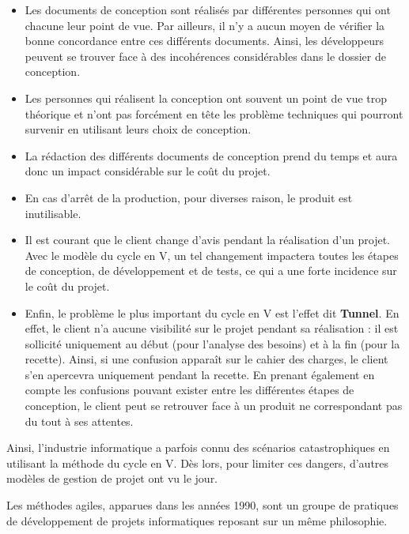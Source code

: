 \begin{itemize}

\item Les documents de conception sont réalisés par différentes personnes qui ont chacune leur point de vue. Par ailleurs, il n'y a aucun moyen de vérifier la bonne concordance entre ces différents documents. Ainsi, les développeurs peuvent se trouver face à des incohérences considérables dans le dossier de conception.

\item Les personnes qui réalisent la conception ont souvent un point de vue trop théorique et n'ont pas forcément en tête les problème techniques qui pourront survenir en utilisant leurs choix de conception.

\item La rédaction des différents documents de conception prend du temps et aura donc un impact considérable sur le coût du projet.

\item En cas d'arrêt de la production, pour diverses raison, le produit est inutilisable.

\item Il est courant que le client change d'avis pendant la réalisation 
d'un projet. Avec le modèle du cycle en V, un tel changement impactera toutes les étapes de conception, de développement et de tests, ce qui a une forte incidence sur le coût du projet.

\item Enfin, le problème le plus important du cycle en V est l'effet dit \textbf{Tunnel}. En effet, le client n'a aucune visibilité sur le projet pendant sa réalisation : il est sollicité uniquement au début (pour l'analyse des besoins) et à la fin (pour la recette). Ainsi, si une confusion apparaît sur le cahier des charges, le client s'en apercevra uniquement pendant la recette. En prenant également en compte les confusions pouvant exister entre les différentes étapes de conception, le client peut se retrouver face à un produit ne correspondant pas du tout à ses attentes.\\

\end{itemize}

Ainsi, l'industrie informatique a parfois connu des scénarios catastrophiques en utilisant la méthode du cycle en V. Dès lors, pour limiter ces dangers, d'autres modèles de gestion de projet ont vu le jour.

Les méthodes agiles, apparues dans les années 1990, sont un groupe de pratiques de développement de projets informatiques reposant sur un même philosophie.

